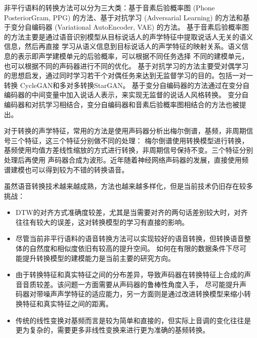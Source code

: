 非平行语料的转换方法可以分为三大类：基于音素后验概率图 (Phone PosteriorGram, PPG) 的方法、基于对抗学习 (Adversarial Learning) 的方法和基于变分自编码器 (Variational AutoEncoder, VAE) 的方法。
基于音素后验概率图的方法主要是通过语音识别模型从目标说话人的声学特征中提取说话人无关的语义信息，然后再直接
学习从语义信息到目标说话人的声学特征的映射关系\cite{sun2016phonetic}。语义信息的表示即声学建模单元的后验概率，可以根据不同任务选择
不同的建模单元，也可以根据不同的声码器进行不同的优化\cite{liu2018hccl,lu2019compact,liu2019jointly,zhou2019cross}。
基于对抗学习的方法主要受对偶学习的思想启发，通过同时学习若干个对偶任务来达到无监督学习的目的。包括一对一转换
CycleGAN\cite{kaneko2017parallel,kaneko2019cyclegan}和多对多转换StarGAN\cite{kameoka2018stargan,kaneko2019stargan}。
基于变分自编码器的方法通过在变分自编码器的中间变量中加入说话人表示，来实现无监督的说话人风格转换\cite{hsu2016voice,kameoka2019acvae}。
变分自编码器和对抗学习相结合\cite{hsu2017voice}，变分自编码器和音素后验概率图相结合\cite{saito2018non}的方法也被提出。

% 

对于转换的声学特征，常用的方法是使用声码器分析出梅尔倒谱，基频，非周期信号三个特征，这三个特征分别做不同的处理：
梅尔倒谱使用转换模型进行转换，基频使用均值方差线性缩放的方式进行转换，非周期信号保持不变。三个特征分别处理后再使用
声码器合成为波形。近年随着神经网络声码器的发展，直接使用频谱建模也可以得到较为不错的转换语音。



虽然语音转换技术越来越成熟，方法也越来越多样化，但是当前技术仍旧存在较多挑战：
\begin{itemize}
    \item DTW的对齐方式准确度较差，尤其是当需要对齐的两句话差别较大时，对齐往往有较大的误差，这对转换模型的学习有直接的影响。
    \item 尽管当前非平行语料的语音转换方法可以实现较好的语音转换，但转换语音整体的自然度和相似度依旧有较高的提升空间。
    如何在有限的数据条件下尽可能提升转换模型的建模能力是当前主要的研究方向。
    \item 由于转换特征和真实特征之间的分布差异，导致声码器在转换特征上合成的声音音质较差。该问题一方面需要从声码器的鲁棒性角度入手，
    尽可能提升声码器对带噪声声学特征的适应能力，另一方面则是通过改进转换模型来缩小转换特征和真实特征之间的距离。
    \item 传统的线性变换对基频而言是较为简单和直接的，但实际上音调的变化往往是更为复杂的，需要更多非线性变换来进行更为准确的基频转换。
\end{itemize}

